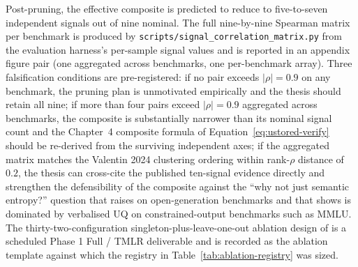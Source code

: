 Post-pruning, the effective composite is predicted to reduce to
five-to-seven independent signals out of nine nominal. The full
nine-by-nine Spearman matrix per benchmark is produced by
\texttt{scripts/signal\_correlation\_matrix.py} from the evaluation
harness's per-sample signal values and is reported in
an appendix figure pair (one
aggregated across benchmarks, one per-benchmark array). Three falsification conditions are pre-registered: if no pair exceeds
$|\rho| = 0.9$ on any benchmark, the pruning plan is unmotivated
empirically and the thesis should retain all nine; if more than four
pairs exceed $|\rho| = 0.9$ aggregated across benchmarks, the
composite is substantially narrower than its nominal signal count
and the Chapter~4 composite formula of
Equation~\ref{eq:ustored-verify} should be re-derived from the
surviving independent axes; if the aggregated matrix matches the
Valentin 2024 clustering ordering within rank-$\rho$ distance of
$0.2$, the thesis can cross-cite the published ten-signal evidence
directly and strengthen the defensibility of the composite against
the ``why not just semantic entropy?'' question that
\citet{farquhar2024nature} raises on open-generation benchmarks and
that \citet{vashurin2024polygraph} shows is dominated by verbalised
UQ on constrained-output benchmarks such as MMLU. The
thirty-two-configuration singleton-plus-leave-one-out ablation design
of \citet{kuhn2023semantic} is a scheduled Phase 1 Full / TMLR
deliverable and is recorded as the ablation template against which
the registry in Table~\ref{tab:ablation-registry} was sized.

